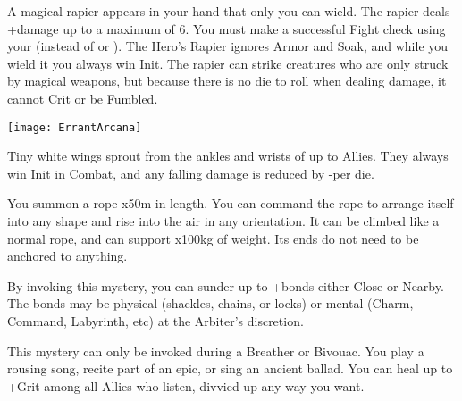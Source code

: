 \MYSTERY [
  Name = Corsair's Blade,
  Link = arcana-mystery-corsairs-blade,
  Paradigm = Force,
  Save = n/a,
  Duration = Session,
  Target = Self
]

A magical rapier appears in your hand that only you can wield.  The rapier deals \DICE+\DICE damage up to a maximum of 6.  You must make a successful Fight check using your \FOC (instead of \VIG or \DEX).  The Hero's Rapier ignores Armor and Soak, and while you wield it you always win Init. The rapier can strike creatures who are only struck by magical weapons, but because there is no die to roll when dealing damage, it cannot Crit or be Fumbled.  


  \begin{center}
  \texttt{[image: ErrantArcana]}
  \end{center}



\MYSTERY [
  Name = Duelists' Wings,
  Link = arcana-mystery-duelists-wings,
  Paradigm = Biomancy,
  Save = n/a,
  Duration = Combat or \SUM Minutes,
  Target = Self or Close Target(s)
]

Tiny white wings sprout from the ankles and wrists of up to \DICE Allies.  They always win Init in Combat, and any falling damage is reduced by -\DICE per die.

\MYSTERY [
  Name = Ropework,
  Link = arcana-mystery-ropework,
  Paradigm = Entropy,
  Save = N,
  Duration = \SUM Minutes,
  Target = Close Target(s)
]

You summon a rope \DICE x50m in length.  You can command the rope to arrange itself into any shape and rise into the air in any orientation.  It can be climbed like a normal rope, and can support \DICE x100kg of weight.  Its ends do not need to be anchored to anything.

\MYSTERY [
  Name = Shatter Bonds,
  Link = arcana-mystery-shatter-bonds,
  Paradigm = Force,
  Save = n/a,
  Duration = Instant,
  Target = Close or Nearby
]

By invoking this mystery, you can sunder up to \DICE+\DICE bonds either Close or Nearby.  The bonds may be physical (shackles, chains, or locks) or mental (Charm, Command, Labyrinth, etc) at the Arbiter's discretion.

\MYSTERY [
  Name = Skald's Tongue,
  Link = arcana-mystery-skalds-tongue,
  Paradigm = Entropy,
  Save = n/a,
  Duration = Breather or Bivouac,
  Target = Close Target(s)
]

This mystery can only be invoked during a Breather or Bivouac.  You play a rousing song, recite part of an epic, or sing an ancient ballad.  You can heal up to \SUMDICE+\DICE Grit among all Allies who listen, divvied up any way you want.

